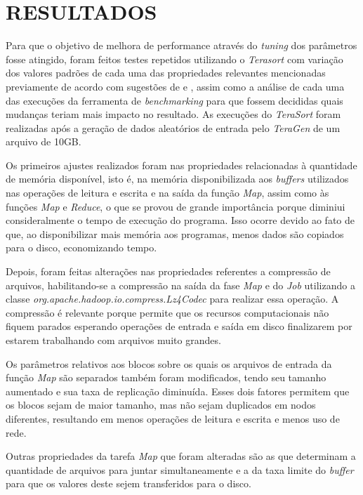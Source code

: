 \section{RESULTADOS} \label{sec:resultados}

Para que o objetivo de melhora de performance através do \textit{\gls{tuning}} dos parâmetros fosse atingido, foram feitos testes repetidos utilizando o \textit{Terasort} com variação dos valores padrões de cada uma das propriedades relevantes mencionadas previamente de acordo com sugestões de \textcite{HadoopBook15} e \textcite{ProHadoop09}, assim como a análise de cada uma das execuções da ferramenta de \textit{\gls{benchmark}ing} para que fossem decididas quais mudanças teriam mais impacto no resultado. As execuções do \textit{TeraSort} foram realizadas após a geração de dados aleatórios de entrada pelo \textit{TeraGen} de um arquivo de 10GB.

Os primeiros ajustes realizados foram nas propriedades relacionadas à quantidade de memória disponível, isto é, na memória disponibilizada aos \textit{\gls{buffer}s} utilizados nas operações de leitura e escrita e na saída da função \textit{Map}, assim como às funções \textit{Map} e \textit{Reduce}, o que se provou de grande importância porque diminiui consideralmente o tempo de execução do programa. Isso ocorre devido ao fato de que, ao disponibilizar mais memória aos programas, menos dados são copiados para o disco, economizando tempo.

Depois, foram feitas alterações nas propriedades referentes a compressão de arquivos, habilitando-se a compressão na saída da fase \textit{Map} e do \textit{Job} utilizando a classe \textit{org.apache.hadoop.io.compress.Lz4Codec} para realizar essa operação. A compressão é relevante porque permite que os recursos computacionais não fiquem parados esperando operações de entrada e saída em disco finalizarem por estarem trabalhando com arquivos muito grandes.

Os parâmetros relativos aos blocos sobre os quais os arquivos de entrada da função \textit{Map} são separados também foram modificados, tendo seu tamanho aumentado e sua taxa de replicação diminuída. Esses dois fatores permitem que os blocos sejam de maior tamanho, mas não sejam duplicados em nodos diferentes, resultando em menos operações de leitura e escrita e menos uso de rede.

Outras propriedades da tarefa \textit{Map} que foram alteradas são as que determinam a quantidade de arquivos para juntar simultaneamente e a da taxa limite do \textit{\gls{buffer}} para que os valores deste sejem transferidos para o disco.


